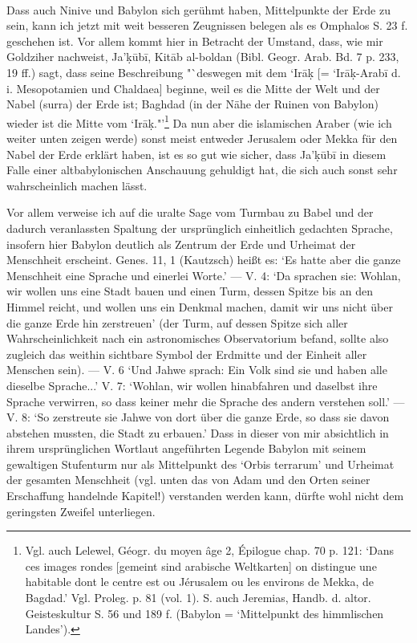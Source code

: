 \documentclass[a4paper, 11pt, oneside]{article}
\begin{document}
\paragraph{}
Dass auch Ninive und Babylon sich gerühmt haben, Mittelpunkte der Erde zu sein, kann ich jetzt mit weit besseren Zeugnissen belegen als es Omphalos S. 23 f. geschehen ist. Vor allem kommt hier in Betracht der Umstand, dass, wie mir Goldziher nachweist, Ja'\d{k}ūbī, Kitāb al-boldan (Bibl. Geogr. Arab. Bd. 7 p. 233, 19 ff.) sagt, dass seine Beschreibung "`deswegen mit dem `Irā\d{k} [= `Irā\d{k}-Arabī d. i. Mesopotamien und Chaldaea] beginne, weil es die Mitte der Welt und der Nabel (surra) der Erde ist; Baghdad (in der Nähe der Ruinen von Babylon) wieder ist die Mitte vom `Irā\d{k}."'\footnote{Vgl. auch Lelewel, Géogr. du moyen âge 2, Épilogue chap. 70 p. 121: `Dans ces images rondes [gemeint sind arabische Weltkarten] on distingue une habitable dont le centre est ou Jérusalem ou les environs de Mekka, de Bagdad.' Vgl. Proleg. p. 81 (vol. 1). S. auch Jeremias, Handb. d. altor. Geisteskultur S. 56 und 189 f. (Babylon = `Mittelpunkt des himmlischen Landes').} Da nun aber die islamischen Araber (wie ich weiter unten zeigen werde) sonst meist entweder Jerusalem oder Mekka für den Nabel der Erde erklärt haben, ist es so gut wie sicher, dass Ja'\d{k}ūbī in diesem Falle einer altbabylonischen Anschauung gehuldigt hat, die sich auch sonst sehr wahrscheinlich machen lässt.

Vor allem verweise ich auf die uralte Sage vom Turmbau zu Babel und der dadurch veranlassten Spaltung der ursprünglich einheitlich gedachten Sprache, insofern hier Babylon deutlich als Zentrum der Erde und Urheimat der Menschheit erscheint. Genes. 11, 1 (Kautzsch) heißt es: `Es hatte aber die ganze Menschheit eine Sprache und einerlei Worte.' --- V. 4: `Da sprachen sie: Wohlan, wir wollen uns eine Stadt bauen und einen Turm, dessen Spitze bis an den Himmel reicht, und wollen uns ein Denkmal machen, damit wir uns nicht über die ganze Erde hin zerstreuen' (der Turm, auf dessen Spitze sich aller Wahrscheinlichkeit nach ein astronomisches Observatorium befand, sollte also zugleich das weithin sichtbare Symbol der Erdmitte und der Einheit aller Menschen sein). --- V. 6 `Und Jahwe sprach: Ein Volk sind sie und haben alle dieselbe Sprache...' V. 7: `Wohlan, wir wollen hinabfahren und daselbst ihre Sprache verwirren, so dass keiner mehr die Sprache des andern verstehen soll.' --- V. 8: `So zerstreute sie Jahwe von dort über die ganze Erde, so dass sie davon abstehen mussten, die Stadt zu erbauen.' Dass in dieser von mir absichtlich in ihrem ursprünglichen Wortlaut angeführten Legende Babylon mit seinem gewaltigen Stufenturm nur als Mittelpunkt des `Orbis terrarum' und Urheimat der gesamten Menschheit (vgl. unten das von Adam und den Orten seiner Erschaffung handelnde Kapitel!) verstanden werden kann, dürfte wohl nicht dem geringsten Zweifel unterliegen.
\end{document}
